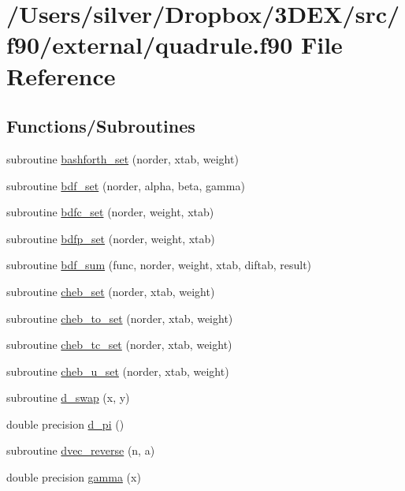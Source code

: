 \hypertarget{quadrule_8f90}{
\section{/Users/silver/Dropbox/3DEX/src/f90/external/quadrule.f90 File Reference}
\label{quadrule_8f90}
}
\subsection*{Functions/Subroutines}
\begin{DoxyCompactItemize}
\item 
subroutine \hyperlink{quadrule_8f90_a5db7bba3aa7d37d932b3f545141b52d4}{bashforth\_\-set} (norder, xtab, weight)
\item 
subroutine \hyperlink{quadrule_8f90_a33c49c6fa2701ed35a7132dfa2ee7a90}{bdf\_\-set} (norder, alpha, beta, gamma)
\item 
subroutine \hyperlink{quadrule_8f90_a7888ddfbe8865b018471ece2f1ac169b}{bdfc\_\-set} (norder, weight, xtab)
\item 
subroutine \hyperlink{quadrule_8f90_ae1f2722140b0af5e1a2bf8e5877222aa}{bdfp\_\-set} (norder, weight, xtab)
\item 
subroutine \hyperlink{quadrule_8f90_aed98218103418a57a42bce561d3f221a}{bdf\_\-sum} (func, norder, weight, xtab, diftab, result)
\item 
subroutine \hyperlink{quadrule_8f90_ade9f4e674221ccedd6251da05db6bbba}{cheb\_\-set} (norder, xtab, weight)
\item 
subroutine \hyperlink{quadrule_8f90_a54208a5fdf9d1d82565b1aa741c51811}{cheb\_\-to\_\-set} (norder, xtab, weight)
\item 
subroutine \hyperlink{quadrule_8f90_aa1f1a725b4cc2ef2f039255e99227f0d}{cheb\_\-tc\_\-set} (norder, xtab, weight)
\item 
subroutine \hyperlink{quadrule_8f90_ac7f04c61f2321ddc4bbf90358305d11e}{cheb\_\-u\_\-set} (norder, xtab, weight)
\item 
subroutine \hyperlink{quadrule_8f90_ab73cf601dce50b6fc79d82a6ee87bb67}{d\_\-swap} (x, y)
\item 
double precision \hyperlink{quadrule_8f90_a1196e8a1c04167d129db7f177728d7fc}{d\_\-pi} ()
\item 
subroutine \hyperlink{quadrule_8f90_a7841cf442902dd98d08b6a4d89a9a7bf}{dvec\_\-reverse} (n, a)
\item 
double precision \hyperlink{quadrule_8f90_a688af4295664e9e84424169e79729a11}{gamma} (x)

\end{DoxyCompactItemize}
